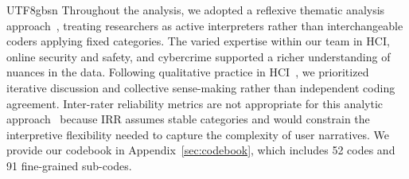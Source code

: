 \documentclass[sigconf,nonacm]{acmart}
\newcommand{\add}[1]{#1}
\begin{document}
\begin{CJK}{UTF8}{gbsn}
\add{Throughout the analysis, we adopted a reflexive thematic analysis approach~\cite{braun2019reflecting}, treating researchers as active interpreters rather than interchangeable coders applying fixed categories. The varied expertise within our team in HCI, online security and safety, and cybercrime supported a richer understanding of nuances in the data. Following qualitative practice in HCI~\cite{mcdonald2019reliability}, we prioritized iterative discussion and collective sense-making rather than independent coding agreement. Inter-rater reliability metrics are not appropriate for this analytic approach~\cite{braun2019reflecting} because IRR assumes stable categories and would constrain the interpretive flexibility needed to capture the complexity of user narratives. We provide our codebook in Appendix~\ref{sec:codebook}, which includes 52 codes and 91 fine-grained sub-codes.} 




\end{CJK}
\end{document}
